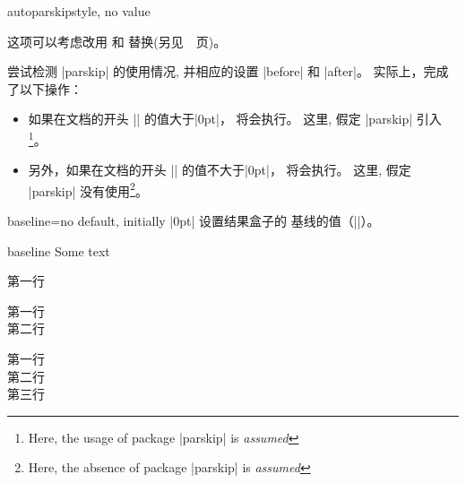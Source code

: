 \begin{docTcbKey}{autoparskip}{}{style, no value}

  这项可以考虑改用  和  替换(另见~\pageref{subsec:surroundings}~页)。\par
  尝试检测 |parskip| 的使用情况, 并相应的设置 |before| 和 |after|。 实际上，完成了以下操作：

  \begin{itemize}
  \item 

如果在文档的开头 |\parskip| 的值大于|0pt|，%
 将会执行。 这里, 假定 |parskip| 引入\footnote{Here, the usage of package |parskip| is \emph{assumed}}。

  \item 
另外，如果在文档的开头 |\parskip| 的值不大于|0pt|，%
 将会执行。 这里, 假定 |parskip| 没有使用\footnote{Here, the absence of package |parskip| is \emph{assumed}}。
  \end{itemize}
\end{docTcbKey}





\begin{docTcbKey}{baseline}{=}{no default, initially |0pt|}
设置结果盒子的%
基线的值（|\pgfsetbaseline|）。

\begin{exdispExample}{baseline}
Some text\dotfill
\begin{tcolorbox}[baseline=3mm]
第一行
\end{tcolorbox}
\begin{tcolorbox}[baseline=3mm]
第一行\\第二行
\end{tcolorbox}
\begin{tcolorbox}[baseline=4mm]
第一行\\第二行\\第三行
  \end{tcolorbox}
\end{exdispExample}
\end{docTcbKey}




